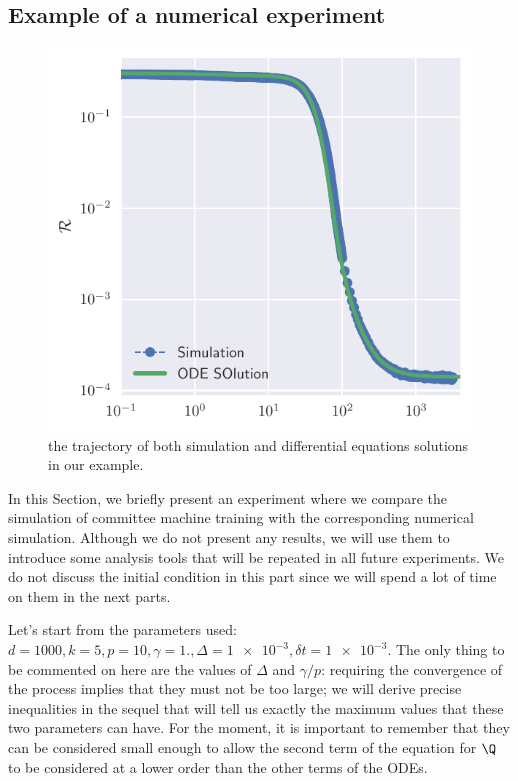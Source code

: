 \subsection{Example of a numerical experiment} \label{subsec:simulation_example}
\begin{figure}
  \begin{center}
    \includegraphics[width=.6\textwidth]{figures/simulation_examples_trajectory.pdf}

    \caption{
      the trajectory of both simulation and differential equations solutions in our example.
    }
    \label{fig:simulation_example_trajectory}
  \end{center}
\end{figure}
In this Section, we briefly present an experiment where we compare the simulation of committee machine training with the corresponding numerical simulation.
Although we do not present any results, we will use them to introduce some analysis tools that will be repeated in all future experiments.
We do not discuss the initial condition in this part since we will spend a lot of time on them in the next parts.

Let's start from the parameters used: \(d=1000, k=5, p=10, \gamma = 1., \Delta = \num{1e-3}, \delta t = \num{1e-3} \).
The only thing to be commented on here are the values of \(\Delta\) and \(\gamma/p\):
requiring the convergence of the process implies that they must not be too large;
we will derive precise inequalities in the sequel that will tell us exactly the maximum values that these two parameters can have.
For the moment, it is important to remember that they can be considered small enough to allow the second term of the equation for \(\Q\) to be considered at a lower order than the other terms of the ODEs.

